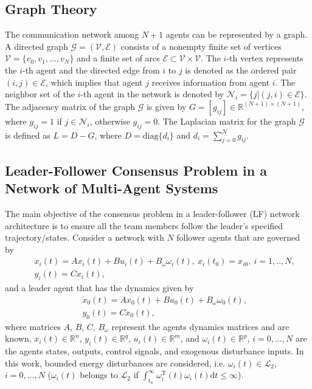 \documentclass[12pt,draftcls,onecolumn]{IEEEtran}
\begin{document}
\subsection{Graph Theory}\label{subsection 1.1}
 The communication network among $N+1$ agents can be represented by a graph. A directed graph $\mathcal{G} = (\mathcal{V}, \mathcal{E})$ consists of a nonempty finite set of vertices $\mathcal{V} =\{ v_0, v_1, . . . , v_N \}$ and a finite set of arcs $\mathcal{E} \subset \mathcal{V} \times \mathcal{V}$. The $i$-{th} vertex represents the $i$-{th} agent and the directed edge from $i$ to $j$ is denoted as the ordered pair $(i,j) \in \mathcal{E} $, which implies that agent $j$ receives information from agent $i$. The neighbor set of the $i$-th agent  in the network is denoted by ${\mathcal{N}}_i=\{ j|(j,i) \in \mathcal{E}\}$. 
The adjacency matrix of the graph $\mathcal{G}$ is given by $G = [g_{ij} ] \in \mathbb{R}^{(N+1)\times (N+1)}$, where $g_{ij} =1$ if $j \in {\mathcal{N}}_i$, otherwise $g_{ij} =0$. The Laplacian matrix for the graph $\mathcal{G}$ is defined as $L=D-G$, where $D=\text{diag} \{d_i\}$ and $d_i=\sum_{j=0}^N{g_{ij}}$. 
\subsection{Leader-Follower Consensus Problem in a Network of Multi-Agent Systems}\label{subsection 1.2}
The main objective of the consensus problem in a leader-follower (LF) network architecture  is to ensure all the team members  follow the leader's specified  trajectory/states.
Consider a network with $N$ follower agents that are governed by
\begin{eqnarray}
&&\dot x_i(t)=A x_i(t)+B u_i(t)+B_\omega \omega_i(t), \ x_i(t_0)=x_{i0}, \ i=1,..,N, \label{LL or F}\\
&&y_i(t)=Cx_i(t),\nonumber
\end{eqnarray}
and a leader  agent that has the dynamics given by
\begin{eqnarray}
&&\dot x_0(t)=Ax_0(t)+Bu_0(t)+B_\omega \omega_0(t),\label{L1}\\
&&y_0(t)=Cx_0(t),\nonumber
\end{eqnarray}
where {matrices $A$, $B$, $C$, $B_\omega$ represent the agents dynamics matrices and  are known,}  $x_i(t) \in \mathbb{R}^n$, $y_i(t)\in \mathbb{R}^q$, $u_i(t) \in \mathbb{R}^{m}$, and $\omega_i(t)\in \mathbb{R}^{p}$, $i=0,\dots,N$ are the agents states, outputs, control signals, and  exogenous disturbance inputs. In this work,  bounded energy disturbances are considered, i.e. $\omega_i(t)\in\mathcal{L}_2$, $i=0,\dots,N$ ($\omega_i(t)$ belongs to $\mathcal{L}_2$ if   $\int_{t_0}^{\infty}\omega_i^{\text{T}}(t)\omega_i(t)\text{d}t\leq\infty$).  
\end{document}
